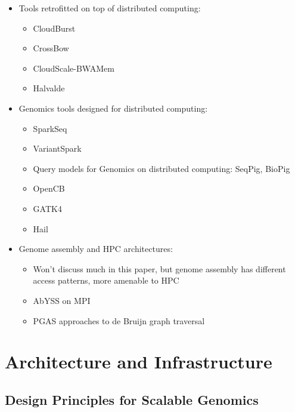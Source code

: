 \documentclass[phd]{ucbthesis}
\begin{document}
\begin{itemize}
\item Tools retrofitted on top of distributed computing:
  \begin{itemize}
  \item CloudBurst
  \item CrossBow
  \item CloudScale-BWAMem
  \item Halvalde
  \end{itemize}
\item Genomics tools designed for distributed computing:
  \begin{itemize}
  \item SparkSeq
  \item VariantSpark    
  \item Query models for Genomics on distributed computing: SeqPig, BioPig
  \item OpenCB
  \item GATK4
  \item Hail
  \end{itemize}
\item Genome assembly and HPC architectures:
  \begin{itemize}
  \item Won't discuss much in this paper, but genome assembly has different
    access patterns, more amenable to HPC
  \item AbYSS on MPI
  \item PGAS approaches to de Bruijn graph traversal
  \end{itemize}
\end{itemize}

\part{Architecture and Infrastructure}

\chapter{Design Principles for Scalable Genomics}
\label{chap:design}
\end{document}
